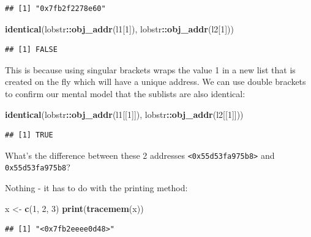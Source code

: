 \documentclass[]{book}
\newenvironment{Shaded}{\begin{snugshade}}{\end{snugshade}}
\newcommand{\DecValTok}[1]{\textcolor[rgb]{0.00,0.00,0.81}{#1}}
\newcommand{\KeywordTok}[1]{\textcolor[rgb]{0.13,0.29,0.53}{\textbf{#1}}}
\newcommand{\NormalTok}[1]{#1}
\newcommand{\OperatorTok}[1]{\textcolor[rgb]{0.81,0.36,0.00}{\textbf{#1}}}
\newcommand{\StringTok}[1]{\textcolor[rgb]{0.31,0.60,0.02}{#1}}
\begin{document}
\begin{verbatim}
## [1] "0x7fb2f2278e60"
\end{verbatim}

\begin{Shaded}
\begin{Highlighting}[]
\KeywordTok{identical}\NormalTok{(lobstr}\OperatorTok{::}\KeywordTok{obj_addr}\NormalTok{(l1[}\DecValTok{1}\NormalTok{]), lobstr}\OperatorTok{::}\KeywordTok{obj_addr}\NormalTok{(l2[}\DecValTok{1}\NormalTok{]))}
\end{Highlighting}
\end{Shaded}

\begin{verbatim}
## [1] FALSE
\end{verbatim}

This is because using singular brackets wraps the value 1 in a new list that is created on the fly which will have a unique address. We can use double brackets to confirm our mental model that the sublists are also identical:

\begin{Shaded}
\begin{Highlighting}[]
\KeywordTok{identical}\NormalTok{(lobstr}\OperatorTok{::}\KeywordTok{obj_addr}\NormalTok{(l1[[}\DecValTok{1}\NormalTok{]]), lobstr}\OperatorTok{::}\KeywordTok{obj_addr}\NormalTok{(l2[[}\DecValTok{1}\NormalTok{]]))}
\end{Highlighting}
\end{Shaded}

\begin{verbatim}
## [1] TRUE
\end{verbatim}

What's the difference between these 2 addresses \texttt{\textless{}0x55d53fa975b8\textgreater{}} and \texttt{0x55d53fa975b8}?

Nothing - it has to do with the printing method:

\begin{Shaded}
\begin{Highlighting}[]
\NormalTok{x <-}\StringTok{ }\KeywordTok{c}\NormalTok{(}\DecValTok{1}\NormalTok{, }\DecValTok{2}\NormalTok{, }\DecValTok{3}\NormalTok{)}
\KeywordTok{print}\NormalTok{(}\KeywordTok{tracemem}\NormalTok{(x))}
\end{Highlighting}
\end{Shaded}

\begin{verbatim}
## [1] "<0x7fb2eeee0d48>"
\end{verbatim}
\end{document}

